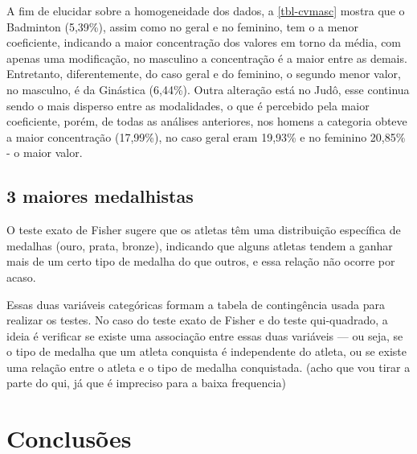 \documentclass[
]{estat/estat}
\begin{document}
A fim de elucidar sobre a homogeneidade dos dados, a \ref{tbl-cvmasc}
mostra que o Badminton (5,39\%), assim como no geral e no feminino, tem
o a menor coeficiente, indicando a maior concentração dos valores em
torno da média, com apenas uma modificação, no masculino a concentração
é a maior entre as demais. Entretanto, diferentemente, do caso geral e
do feminino, o segundo menor valor, no masculno, é da Ginástica
(6,44\%). Outra alteração está no Judô, esse continua sendo o mais
disperso entre as modalidades, o que é percebido pela maior coeficiente,
porém, de todas as análises anteriores, nos homens a categoria obteve a
maior concentração (17,99\%), no caso geral eram 19,93\% e no feminino
20,85\% - o maior valor.

\subsection{3 maiores medalhistas}\label{maiores-medalhistas}

O teste exato de Fisher sugere que os atletas têm uma distribuição
específica de medalhas (ouro, prata, bronze), indicando que alguns
atletas tendem a ganhar mais de um certo tipo de medalha do que outros,
e essa relação não ocorre por acaso.

Essas duas variáveis categóricas formam a tabela de contingência usada
para realizar os testes. No caso do teste exato de Fisher e do teste
qui-quadrado, a ideia é verificar se existe uma associação entre essas
duas variáveis --- ou seja, se o tipo de medalha que um atleta conquista
é independente do atleta, ou se existe uma relação entre o atleta e o
tipo de medalha conquistada. (acho que vou tirar a parte do qui, já que
é impreciso para a baixa frequencia)

\section{Conclusões}\label{conclusuxf5es}
\end{document}
